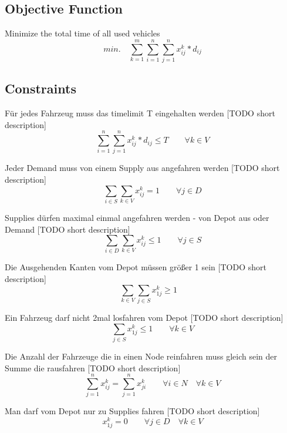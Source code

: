 \documentclass[a4paper]{article}
\begin{document}
\subsection*{Objective Function}
Minimize the total time of all used vehicles
\begin{equation}
min. \quad \sum_{k=1}^m \sum_{i=1}^n  \sum_{j=1}^n x_{ij}^k * d_{ij}
\end{equation}

\subsection*{Constraints}
Für jedes Fahrzeug muss das timelimit T eingehalten werden [TODO short description]
\begin{equation}
\sum_{i=1}^n  \sum_{j=1}^n x_{ij}^k * d_{ij} \leq T		\quad \quad		\forall k \in V 
\end{equation}

Jeder Demand muss von einem Supply aus angefahren werden [TODO short description]
\begin{equation}
\sum_{i \in S} \sum_{k \in V} x_{ij}^k = 1		\quad 
\quad		\forall j \in D
\end{equation}

Supplies dürfen maximal einmal angefahren werden - von Depot aus oder Demand [TODO short description]
\begin{equation}
\sum_{i \in D} \sum_{k \in V} x_{ij}^k \leq 1		\quad 
\quad		\forall j \in S
\end{equation}

Die Ausgehenden Kanten vom Depot müssen größer 1 sein [TODO short description]
\begin{equation}
\sum_{k \in V} \sum_{j \in S} x_{1j}^k \geq 1		\quad 
\end{equation}

Ein Fahrzeug darf nicht 2mal losfahren vom Depot [TODO short description]
\begin{equation}
\sum_{j \in S} x_{1j}^k \leq 1		\quad 
\quad		\forall k \in V 
\end{equation}

Die Anzahl der Fahrzeuge die in einen Node reinfahren muss gleich sein der Summe die rausfahren [TODO short description]
\begin{equation}
\sum_{j=1}^n x_{ij}^k = \sum_{j=1}^n x_{ji}^k		\quad 
\quad		\forall i \in N 
\quad		\forall k \in V 
\end{equation}

Man darf vom Depot nur zu Supplies fahren [TODO short description]
\begin{equation}
x_{1j}^k = 0		\quad 
\quad		\forall j \in D
\quad		\forall k \in V 
\end{equation}
\end{document}
